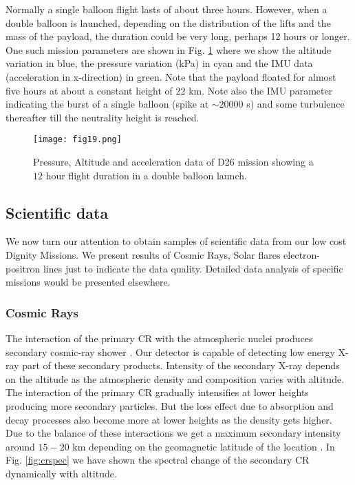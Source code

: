 Normally a single balloon flight lasts of about three hours. However, when a double
balloon is launched, depending on the distribution of the lifts and the mass of the 
payload, the duration could be very long, perhaps 12 hours or longer. One such 
mission parameters are shown in Fig. \ref{fig:d26} where we show the altitude variation in blue,
the pressure variation (kPa) in cyan and the IMU data (acceleration in x-direction) in green. Note that the payload
floated for almost five hours at about a constant height of 22 km. Note also the IMU parameter 
indicating the burst of a single balloon (spike at $\sim 20000$ s) and some turbulence thereafter till the neutrality 
height is reached. 

\begin{figure}[h]
  \centering
  \texttt{[image: fig19.png]}
  \caption{Pressure, Altitude and acceleration data of D26 mission showing a $12$ hour
  flight duration in a double balloon launch.}
   \label{fig:d26}
\end{figure}

\subsection{Scientific data}

We now turn our attention to obtain samples of scientific data from our low cost
Dignity Missions. We present results of Cosmic Rays, Solar flares electron-positron 
lines just to indicate the data quality. Detailed data analysis  of specific missions
would be presented elsewhere. 

\subsubsection{Cosmic Rays}

The interaction of the primary CR with the atmospheric nuclei produces 
secondary cosmic-ray shower \citep{grie01,gais90}. 
Our detector is capable of detecting low energy X-ray 
part of these secondary products. Intensity of the secondary X-ray depends on 
the altitude as the atmospheric density and composition varies with altitude.
The interaction of the primary CR gradually intensifies at lower heights producing 
more secondary particles. But the loss effect due to absorption and decay processes
also become more at lower heights as the density gets higher. Due to the balance 
of these interactions we get a maximum secondary intensity around $15-20$ km 
depending on the geomagnetic latitude of the location \citep{bazi98, harr14, li07, shon77, yani16}.
In Fig. \ref{fig:crspec} we have shown the spectral change of the secondary CR dynamically 
with altitude.

